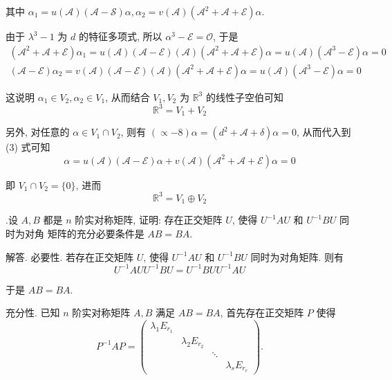 \documentclass{article}
\begin{document}
其中 $\alpha_{1}=u(\mathscr{A})(\mathscr{A}-\mathscr{S}) \alpha, \alpha_{2}=v(\mathscr{A})\left(\mathscr{A}^{2}+\mathscr{A}+\mathscr{E}\right) \alpha .$

由于 $\lambda^{3}-1$ 为 $d$ 的特征多项式, 所以 $\alpha^{3}-\mathscr{E}=\mathscr{O}$, 于是
\begin{gather*}
    \left(\mathscr{A}^{2}+\mathscr{A}+\mathscr{E}\right)\alpha_1=u(\mathscr{A})(\mathscr{A}-\mathscr{E})(\mathscr{A})\left(\mathscr{A}^{2}+\mathscr{A}+\mathscr{E}\right) \alpha=u(\mathscr{A})(\mathscr{A}^3-\mathscr{E})\alpha=0 \\
    \left(\mathscr{A}-\mathscr{E}\right)\alpha_2=v(\mathscr{A})(\mathscr{A}-\mathscr{E})(\mathscr{A})\left(\mathscr{A}^{2}+\mathscr{A}+\mathscr{E}\right) \alpha=u(\mathscr{A})(\mathscr{A}^3-\mathscr{E})\alpha=0
\end{gather*}

这说明 $\alpha_{1} \in V_{2}, \alpha_{2} \in V_{1}$, 从而结合 $V_{1}, V_{2}$ 为 $\mathbb{R}^{3}$ 的线性子空伯可知
$$\mathbb{R}^{3}=V_{1}+V_{2}$$

另外, 对任意的 $\alpha \in V_{1} \cap V_{2}$, 则有 $(\propto-8) \alpha=\left(d^{2}+\mathscr{A}+\delta\right) \alpha=0$, 从而代入到(3) 式可知
\begin{equation*}
    \alpha=u(\mathscr{A})(\mathscr{A}-\mathscr{E}) \alpha+v(\mathscr{A})\left(\mathscr{A}^{2}+\mathscr{A}+\mathscr{E}\right) \alpha=0
\end{equation*}

即 $V_{1} \cap V_{2}=\{0\}$, 进而
$$
    \mathbb{R}^{3}=V_{1} \oplus V_{2}
$$

\vspace{1ex}
{.}设 $A, B$ 都是 $n$ 阶实对称矩阵, 证明: 存在正交矩阵 $U$, 使得 $U^{-1} A U$ 和 $U^{-1} B U$ 同时为对角 矩阵的充分必要条件是 $A B=B A$.

解答. 必要性. 若存在正交矩阵 $U$, 使得 $U^{-1} A U$ 和 $U^{-1} B U$ 同时为对角矩阵. 则有
$$U^{-1} A U U^{-1} B U=U^{-1} B U U^{-1} A U$$

于是 $A B=B A$.

充分性. 已知 $n$ 阶实对称矩阵 $A, B$ 满足 $A B=B A$, 首先存在正交矩阵 $P$ 使得
$$
    P^{-1} A P=\left(\begin{array}{cccc}
            \lambda_{1} E_{r_{1}} &                       &        &                       \\
                                  & \lambda_{2} E_{r_{2}} &        &                       \\
                                  &                       & \ddots &                       \\
                                  &                       &        & \lambda_{s} E_{r_{r}}
        \end{array}\right) .
$$
\end{document}
